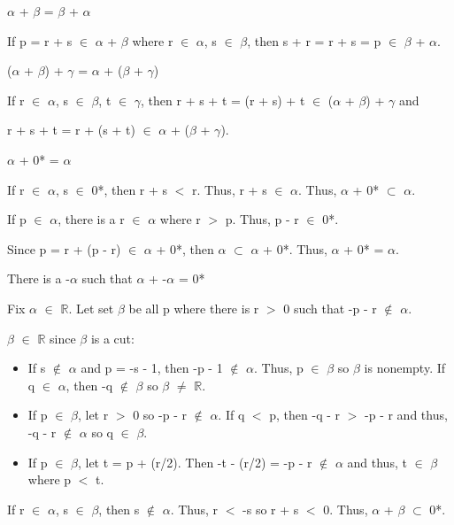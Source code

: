 \begin{adjustbox}{minipage=16cm, right, vspace=0.1cm 0cm}
		$\alpha$ + $\beta$ = $\beta$ + $\alpha$

			\qquad If p = r + s $\in$ $\alpha$ + $\beta$ where
			r $\in$ $\alpha$, s $\in$ $\beta$, then s + r = r + s = p $\in$ $\beta$ + $\alpha$.

		($\alpha$ + $\beta$) + $\gamma$  = $\alpha$ + ($\beta$ + $\gamma$)

			\qquad If r $\in$ $\alpha$, s $\in$ $\beta$, t $\in$ $\gamma$, then
			r + s + t = (r + s) + t $\in$ ($\alpha$ + $\beta$) + $\gamma$ and

			\qquad r + s + t = r + (s + t) $\in$ $\alpha$ + ($\beta$ + $\gamma$).

		$\alpha$ + 0* = $\alpha$

			\qquad If r $\in$ $\alpha$, s $\in$ 0*, then r + s $<$ r. Thus, r + s $\in$ $\alpha$.
			Thus, $\alpha$ + 0* $\subset$ $\alpha$.

			\qquad If p $\in$ $\alpha$, there is a r $\in$ $\alpha$ where r $>$ p.
			Thus, p - r $\in$ 0*.

			\qquad Since p = r + (p - r) $\in$ $\alpha$ + 0*, then $\alpha$ $\subset$ $\alpha$ + 0*.
			Thus, $\alpha$ + 0* = $\alpha$.

		There is a -$\alpha$ such that $\alpha$ + -$\alpha$ = 0*

			\qquad Fix $\alpha$ $\in$ $\mathbb{R}$. Let set $\beta$ be all p where
			there is r $>$ 0 such that -p - r $\not \in$ $\alpha$.

			\qquad $\beta$ $\in$ $\mathbb{R}$ since $\beta$ is a cut:

			\begin{itemize}[leftmargin=2cm, itemsep=0.1cm]
				\item If s $\not \in$ $\alpha$ and p = -s - 1, then -p - 1 $\not \in$ $\alpha$.
					Thus, p $\in$ $\beta$ so $\beta$ is nonempty.
					If q $\in$ $\alpha$, then -q $\not \in$ $\beta$ so $\beta$ $\neq$ $\mathbb{R}$.

				\item If p $\in$ $\beta$, let r $>$ 0 so -p - r $\not \in$ $\alpha$.
					If q $<$ p, then -q - r $>$ -p - r and thus, -q - r $\not \in$ $\alpha$
					so q $\in$ $\beta$.

				\item If p $\in$ $\beta$, let t = p + (r/2). Then
					-t - (r/2) = -p - r $\not \in$ $\alpha$ and thus, t $\in$ $\beta$
					where p $<$ t.
			\end{itemize}
			
			\qquad If r $\in$ $\alpha$, s $\in$ $\beta$, then s $\not \in$ $\alpha$. Thus,
			r $<$ -s so r + s $<$ 0. Thus, $\alpha$ + $\beta$ $\subset$ 0*.


\end{adjustbox}
